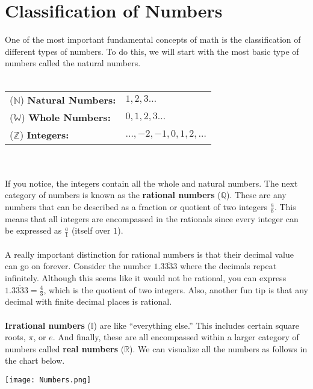 
\section{Classification of Numbers}
One of the most important fundamental concepts of math is the classification of different types of numbers. To do this, we will start with the most basic type of numbers called the natural numbers. \\
\\
\begin{tabular}{ll}
     ($\mathbb{N}$) \textbf{Natural Numbers:} & $1,2,3 \dots$\\
     ($\mathbb{W}$) \textbf{Whole Numbers:} & $0,1,2,3 \dots$\\
     ($\mathbb{Z}$) \textbf{Integers:} & $\dots,-2,-1,0,1,2,\dots$
\end{tabular}\\
\\
If you notice, the integers contain all the whole and natural numbers. The next category of numbers is known as the \textbf{rational numbers} ($\mathbb{Q}$). These are any numbers that can be described as a fraction or quotient of two integers $\frac{a}{b}$. This means that all integers are encompassed in the rationals since every integer can be expressed as $\frac{a}{1}$ (itself over $1$). \\
\\
A really important distinction for rational numbers is that their decimal value can go on forever. Consider the number $1.\overline{3333}$ where the decimals repeat infinitely. Although this seems like it would not be rational, you can express $1.\overline{3333} = \frac{4}{3}$, which is the quotient of two integers. Also, another fun tip is that any decimal with finite decimal places is rational. \\
\\
\textbf{Irrational numbers} ($\mathbb{I}$) are like ``everything else.'' This includes certain square roots, $\pi$, or $e$. And finally, these are all encompassed within a larger category of numbers called \textbf{real numbers} ($\mathbb{R}$). We can visualize all the numbers as follows in the chart below.\\
\begin{center}
    \texttt{[image: Numbers.png]}
\end{center}


\pagebreak
